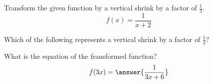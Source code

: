 \documentclass{ximera}
\author{Ivo Terek}
\begin{document}
Transform the given function by a vertical shrink by a factor of $\frac{1}{3}$.
\[
f(x)=\frac{1}{x+2}
\]
\begin{exercise}
Which of the following represents a vertical shrink by a factor of $\frac{1}{3}$?
\begin{multipleChoice}
\end{multipleChoice}
\end{exercise}
\begin{exercise}
What is the equation of the fransformed function?
\[
f(3x)=\answer{\frac{1}{3x+6}}
\]
\end{exercise}
\end{document}
